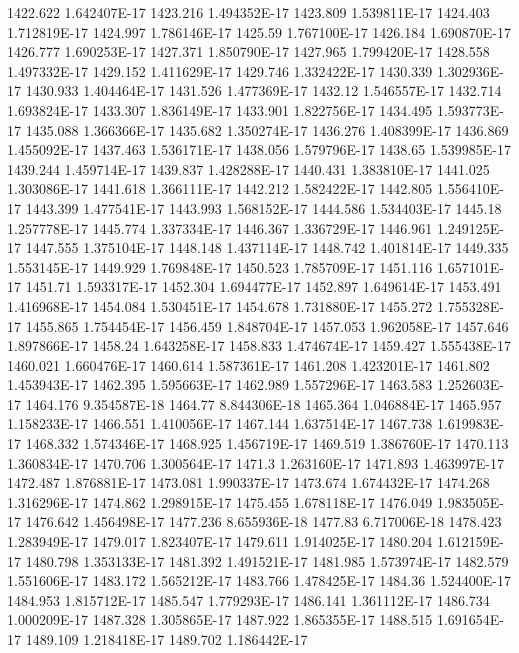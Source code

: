 1422.622  1.642407E-17
1423.216  1.494352E-17
1423.809  1.539811E-17
1424.403  1.712819E-17
1424.997  1.786146E-17
1425.59  1.767100E-17
1426.184  1.690870E-17
1426.777  1.690253E-17
1427.371  1.850790E-17
1427.965  1.799420E-17
1428.558  1.497332E-17
1429.152  1.411629E-17
1429.746  1.332422E-17
1430.339  1.302936E-17
1430.933  1.404464E-17
1431.526  1.477369E-17
1432.12  1.546557E-17
1432.714  1.693824E-17
1433.307  1.836149E-17
1433.901  1.822756E-17
1434.495  1.593773E-17
1435.088  1.366366E-17
1435.682  1.350274E-17
1436.276  1.408399E-17
1436.869  1.455092E-17
1437.463  1.536171E-17
1438.056  1.579796E-17
1438.65  1.539985E-17
1439.244  1.459714E-17
1439.837  1.428288E-17
1440.431  1.383810E-17
1441.025  1.303086E-17
1441.618  1.366111E-17
1442.212  1.582422E-17
1442.805  1.556410E-17
1443.399  1.477541E-17
1443.993  1.568152E-17
1444.586  1.534403E-17
1445.18  1.257778E-17
1445.774  1.337334E-17
1446.367  1.336729E-17
1446.961  1.249125E-17
1447.555  1.375104E-17
1448.148  1.437114E-17
1448.742  1.401814E-17
1449.335  1.553145E-17
1449.929  1.769848E-17
1450.523  1.785709E-17
1451.116  1.657101E-17
1451.71  1.593317E-17
1452.304  1.694477E-17
1452.897  1.649614E-17
1453.491  1.416968E-17
1454.084  1.530451E-17
1454.678  1.731880E-17
1455.272  1.755328E-17
1455.865  1.754454E-17
1456.459  1.848704E-17
1457.053  1.962058E-17
1457.646  1.897866E-17
1458.24  1.643258E-17
1458.833  1.474674E-17
1459.427  1.555438E-17
1460.021  1.660476E-17
1460.614  1.587361E-17
1461.208  1.423201E-17
1461.802  1.453943E-17
1462.395  1.595663E-17
1462.989  1.557296E-17
1463.583  1.252603E-17
1464.176  9.354587E-18
1464.77  8.844306E-18
1465.364  1.046884E-17
1465.957  1.158233E-17
1466.551  1.410056E-17
1467.144  1.637514E-17
1467.738  1.619983E-17
1468.332  1.574346E-17
1468.925  1.456719E-17
1469.519  1.386760E-17
1470.113  1.360834E-17
1470.706  1.300564E-17
1471.3  1.263160E-17
1471.893  1.463997E-17
1472.487  1.876881E-17
1473.081  1.990337E-17
1473.674  1.674432E-17
1474.268  1.316296E-17
1474.862  1.298915E-17
1475.455  1.678118E-17
1476.049  1.983505E-17
1476.642  1.456498E-17
1477.236  8.655936E-18
1477.83  6.717006E-18
1478.423  1.283949E-17
1479.017  1.823407E-17
1479.611  1.914025E-17
1480.204  1.612159E-17
1480.798  1.353133E-17
1481.392  1.491521E-17
1481.985  1.573974E-17
1482.579  1.551606E-17
1483.172  1.565212E-17
1483.766  1.478425E-17
1484.36  1.524400E-17
1484.953  1.815712E-17
1485.547  1.779293E-17
1486.141  1.361112E-17
1486.734  1.000209E-17
1487.328  1.305865E-17
1487.922  1.865355E-17
1488.515  1.691654E-17
1489.109  1.218418E-17
1489.702  1.186442E-17
